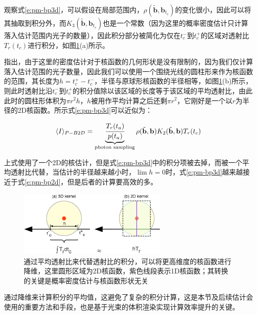 观察式\ref{e:pm-bp3d}，可以假设在局部范围内，$\rho(\tilde{\mathbf{b}},\mathbf{b}_{t_c})$的变化很小，因此可以将其抽取到积分外，而$K_3(\tilde{\mathbf{b}},\mathbf{b}_{t_c})$也是一个常数（因为这里的概率密度估计只计算落入估计范围内光子的数量），因此积分部分被简化为仅在$t^{-}_{c}$到$t^{+}_{c}$的区域对透射比$T_r(t_c)$进行积分，如图\ref{f:pm-averaging-transmittance}(a)所示。

\cite{a:AComprehensiveTheoryofVolumetricRadianceEstimationusingPhotonPointsandBeams}指出，由于这里的密度估计对于核函数的几何形状是没有限制的，因为我们仅计算落入估计范围的光子数量，因此我们可以使用一个围绕光线的圆柱形来作为核函数的范围，其长度为$h=t^{+}_c-t^{-}_c$，半径与原球形核函数的半径相等，如图\ref{f:pm-averaging-transmittance}(b)所示，则此时透射比沿$t^{-}_{c}$到$t^{+}_{c}$的积分值除以该区域的长度等于该区域的平均透射比，由此此时的圆柱形体积为$\pi r^{2}h$，$h$被用作平均计算之后还剩$\pi r^{2}$，它刚好是一个以$r$为半径的2D核函数。所示式\ref{e:pm-bp3d}可以近似为：

\begin{equation}\label{e:pm-pb2d}
	\langle I\rangle_{P-B2D}=\underbrace{ \cfrac{T_r(t_a)}{p(t_a)}}_{\text{photon sampling}}\rho(\tilde{\mathbf{b}},\mathbf{b})K_2(\tilde{\mathbf{b}},\mathbf{b})T_r(t_c)
\end{equation}

上式使用了一个2D的核估计，但是式\ref{e:pm-bp3d}中的积分项被去掉，而被一个平均透射比代替，当估计的半径越来越小时，$\lim{h}=0$时，式\ref{e:pm-bp3d}越来越接近于式\ref{e:pm-bp2d}，但是后者的计算要高效的多。

\begin{figure}
	\sidecaption
	\includegraphics[width=0.65\textwidth]{figures/pm/averaging-transmittance}
	\caption{通过平均透射比来代替透射比的积分，可以将更高维度的核函数进行降维，这里圆形区域为2D核函数，紫色线段表示1D核函数；其转换的关键是概率密度估计与核函数形状无关}
	\label{f:pm-averaging-transmittance}
\end{figure}

通过降维来计算积分的平均值，这避免了复杂的积分计算，这是本节及后续估计会使用的重要方法和手段，也是基于光束的体积渲染实现计算效率提升的关键。





